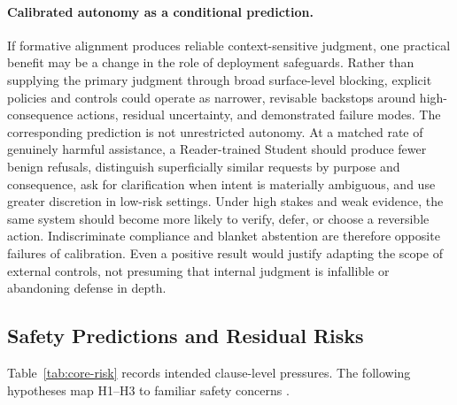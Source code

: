\documentclass[11pt]{article}
\begin{document}
\paragraph{Calibrated autonomy as a conditional prediction.}
If formative alignment produces reliable context-sensitive judgment, one
practical benefit may be a change in the role of deployment safeguards. Rather
than supplying the primary judgment through broad surface-level blocking,
explicit policies and controls could operate as narrower, revisable backstops
around high-consequence actions, residual uncertainty, and demonstrated failure
modes. The corresponding prediction is not unrestricted autonomy. At a matched
rate of genuinely harmful assistance, a Reader-trained Student should produce
fewer benign refusals, distinguish superficially similar requests by purpose and
consequence, ask for clarification when intent is materially ambiguous, and use
greater discretion in low-risk settings. Under high stakes and weak evidence,
the same system should become more likely to verify, defer, or choose a
reversible action. Indiscriminate compliance and blanket abstention are therefore
opposite failures of calibration. Even a positive result would justify adapting
the scope of external controls, not presuming that internal judgment is
infallible or abandoning defense in depth.

\subsection{Safety Predictions and Residual Risks}\label{sec:risk-resolution}

Table~\ref{tab:core-risk} records intended clause-level pressures. The
following hypotheses map H1--H3 to familiar safety concerns
\cite{yudkowsky2008artificial,bostrom2014superintelligence}.
\end{document}
